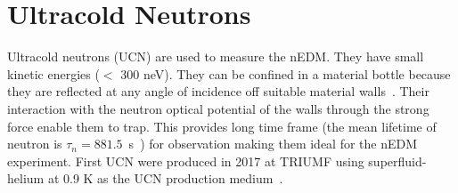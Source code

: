 



\section{Ultracold Neutrons}
Ultracold neutrons (UCN) are used to measure the nEDM. They have small kinetic energies ($<$ 300 neV).  They can be confined in a material bottle because they are reflected at any angle of incidence off suitable material walls~\cite{ucn_storage}. Their interaction with the neutron optical potential of the walls through the strong force enable them to trap. This provides long time frame (the mean lifetime of neutron is $\tau_n=881.5$~s~\cite{mike}) for observation making them ideal for the nEDM experiment. First UCN were produced in 2017 at TRIUMF using superfluid-helium at 0.9 K as the UCN production medium~\cite{TRIUMF_UCN,taraneh_theis,TRIUMF_Beamline}.

